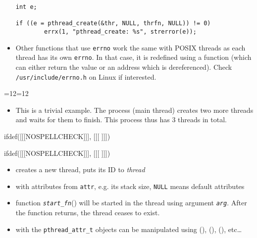 \begin{itemize}
\begin{verbatim}
int e;

if ((e = pthread_create(&thr, NULL, thrfn, NULL)) != 0)
        errx(1, "pthread_create: %s", strerror(e));
\end{verbatim}

\item \label{ERRNO_IN_THREADS} Other functions that use \texttt{errno} work the
same with POSIX threads as each thread has its own \texttt{errno}.  In that
case, it is redefined using a function (which can either return the value or an
address which is dereferenced).  Check \texttt{/usr/include/errno.h} on Linux if
interested.
\end{itemize}


\begin{slide}
{=12=12
\begin{center}

\end{center}}
\end{slide}

\begin{itemize}
\item This is a trivial example.  The process (main thread) creates two more
threads and waits for them to finish.  This process thus has 3 threads in
total.
\end{itemize}


ifdef([[[NOSPELLCHECK]]], [[[
]]])

\begin{slide}
\label{PTHREAD_T}
ifdef([[[NOSPELLCHECK]]], [[[
]]])
\begin{itemize}
\item creates a new thread, puts its ID to \emph{thread}
\item with attributes from \texttt{attr}, e.g. its stack size,
\texttt{NULL} means default attributes
\item function \emph{\texttt{start\_fn}}() will be started in the thread using
argument \emph{\texttt{arg}}. After the function returns, the thread ceases to
exist.
\item with the \texttt{pthread\_attr\_t} objects can be manipulated using
(), (),
(), etc\dots{}
\end{itemize}
\end{slide}

